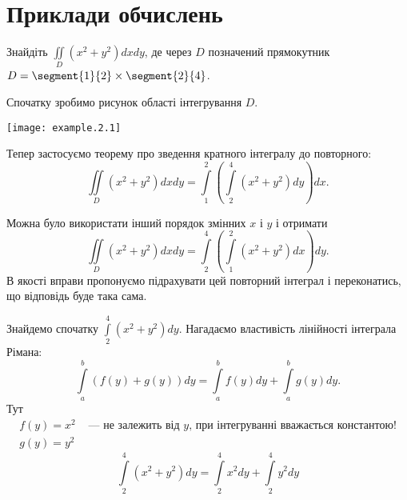 \chapter{Приклади обчислень}
\begin{example}
Знайдіть ${\iint\limits_{D}\left(x^2+y^2\right)d x d y}$, де через $D$ позначений пря\-мо\-кут\-ник ${D = \segment{1}{2}\times\segment{2}{4}}$.

Спочатку зробимо рисунок області інтегрування $D$.

\texttt{[image: example.2.1]}

Тепер застосуємо теорему про зведення кратного інтегралу до повторного:
\[
\iint\limits_{D}\left(x^2+y^2\right)d x d y = \int\limits_1^2\left(\int\limits_{2}^{4}\left(x^{2}+y^{2}\right)d y\right)dx.
\]
\begin{remark}
Можна було використати інший порядок змінних $x$ і $y$ і отримати
\[
\iint\limits_{D}\left(x^2+y^2\right)d x d y = \int\limits_{2}^{4}\left(\int\limits_1^2\left(x^{2}+y^{2}\right) d x\right)d y.
\]
В якості вправи пропонуємо підрахувати цей повторний інтеграл і переконатись, що відповідь буде така сама.
\end{remark}
Знайдемо спочатку $\int\limits_{2}^{4}\left(x^{2}+y^{2}\right)d y$. Нагадаємо властивість лінійності інтеграла Рімана:
\[
\int\limits_{a}^{b}\left(f(y)+g(y)\right)d y = \int\limits_{a}^{b}f(y)d y+\int\limits_{a}^{b}g(y)d y.
\]
Тут
\[
\begin{array}{cc}
f(y) = x^2 & \mbox{ --- не залежить від } y\mbox{, при інтегруванні вважається константою!}\\
g(y) = y^2 &
\end{array}
\]
\[
\int\limits_{2}^{4}\left(x^{2}+y^{2}\right)d y = \int\limits_{2}^{4}x^{2}d y+\int\limits_{2}^{4}y^{2}d y
\]


\end{example}
